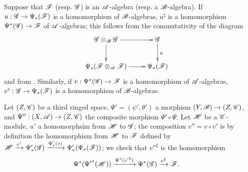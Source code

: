 \begin{env}[4.4.7]
\label{0.4.4.7}
Suppose that $\mathscr{F}$ (resp. $\mathscr{G}$) is an $\mathscr{A}$-algebra (resp. a $\mathscr{B}$-algebra). If
$u:\sh{G}\to\Psi_*(\sh{F})$ is a homomorphism of $\mathscr{B}$-algebras, $u^\sharp$ is a
homomorphism $\Psi^*(\sh{G})\to\sh{F}$ of $\mathscr{A}$-algebras; this follows from the
commutativity of the diagram
\[
  \xymatrix{
    \sh{G}\otimes_\sh{B}\sh{G}\ar[r]\ar[d] &
    \sh{G}\ar[d]^u\\
    \Psi_*(\sh{F}\otimes_\sh{A}\sh{F})\ar[r] &
    \Psi_*(\sh{F})
  }
\]
and from . Similarly, if $v:\Psi^*(\sh{G})\to\sh{F}$ is a homomorphism of
$\mathscr{A}$-algebras, $v^\flat:\sh{G}\to\Psi_*(\sh{F})$ is a homomorphism of $\mathscr{B}$-algebras.
\end{env}

\begin{env}[4.4.8]
\label{0.4.4.8}
Let $(Z,\mathscr{C})$ be a third ringed space, $\Psi'=(\psi',\theta')$ a morphism
$(Y,\sh{B})\to(Z,\sh{C})$, and $\Psi'':(X,\sh{A})\to(Z,\sh{C})$ the composite morphism
$\Psi'\circ\Psi$. Let $\mathscr{H}$ be a $\mathscr{C}$-module, $u'$ a homomorphsim from $\mathscr{H}$ to
$\mathscr{G}$; the composition $v''=v\circ v'$ is by definition the homomorphism from $\mathscr{H}$ to
$\mathscr{F}$ defined by
$\mathscr{H}\xrightarrow{v'}\Psi_*'(\mathscr{G})\xrightarrow{\Psi_*'(v)}\Psi_*'(\Psi_*(\mathscr{F}))$; we
check that ${v''}^\sharp$ is the homomorphism
\[
  \Psi^*({\Psi'}^*(\mathscr{H}))\xrightarrow{\Psi^*({v'}^\sharp)}\Psi^*(\mathscr{G})
  \xrightarrow{v^\sharp}\mathscr{F}.
\]
\end{env}

